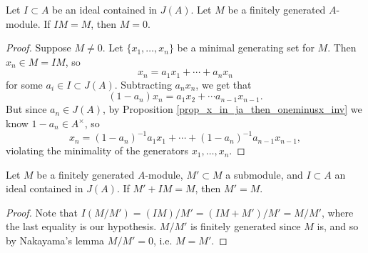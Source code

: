 \documentclass[12pt]{article}
\begin{document}
\begin{theorem}
\label{thm_nakayamas_lemma}
	Let $I\subset A$ be an ideal contained in $J(A)$. Let $M$ be a finitely generated $A$-module. If $IM=M$, then $M=0$. 
\end{theorem}
\begin{proof}
	Suppose $M\neq 0$. Let $\{x_1,\dots,x_n\}$ be a minimal generating set for $M$. Then $x_n\in M=IM$, so 
	\begin{equation*}
		x_n=a_1x_1 + \cdots + a_nx_n
	\end{equation*}
	for some $a_i\in I\subset J(A)$. Subtracting $a_nx_n$, we get that
	\begin{equation*}
		(1-a_n)x_n = a_1x_2 + \cdots a_{n-1}x_{n-1}.
	\end{equation*}
	But since $a_n\in J(A)$, by Proposition \ref{prop_x_in_ja_then_oneminusx_inv} we know $1-a_n\in A^\times$, so 
	\begin{equation*}
		x_n = (1-a_n)^{-1}a_1x_1 + \cdots + (1-a_n)^{-1}a_{n-1}x_{n-1},
	\end{equation*}
	violating the minimality of the generators $x_1,\dots,x_n$.
\end{proof}

\begin{corollary}
\label{cor_nakayama_m_equals_mprime}
	Let $M$ be a finitely generated $A$-module, $M'\subset M$ a submodule, and $I\subset A$ an ideal contained in $J(A)$. If $M'+IM=M$, then $M'=M$.
\end{corollary}
\begin{proof}
	Note that $I(M/M')=(IM)/M'=(IM+M')/M'=M/M'$, where the last equality is our hypothesis. $M/M'$ is finitely generated since $M$ is, and so by Nakayama's lemma $M/M'=0$, i.e. $M=M'$.
\end{proof}
\end{document}
